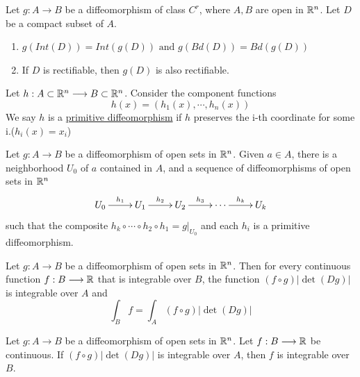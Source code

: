 \begin{theorem}
    Let $g:A\longrightarrow B$ be a diffeomorphism of class $C^r$, where $A,B$ are open in $\mathbb{R}^n$. Let $D$ be a compact subset of $A$.
    \begin{enumerate}
        \item $g(Int(D))=Int(g(D))\text{ and }g(Bd(D))=Bd(g(D))$
        \item If $D$ is rectifiable, then $g(D)$ is also rectifiable.
    \end{enumerate}
\end{theorem}

\begin{definition}
    Let $h:A\subset \mathbb{R}^n\longrightarrow B\subset \mathbb{R}^n$. Consider the component functions $$h(x)=(h_1(x),\cdots,h_n(x))$$
    We say $h$ is a \underline{primitive diffeomorphism} if $h$ preserves the i-th coordinate for some i.($h_i(x)=x_i$)
\end{definition}

\begin{theorem}
    Let $g:A\longrightarrow B$ be a diffeomorphism of open sets in $\mathbb{R}^n$. Given $a\in A$, there is a neighborhood $U_0$ of $a$ contained in $A$, and a sequence of diffeomorphisms of open sets in $\mathbb{R}^n$
    \begin{equation*}
        \xymatrix{U_0 \ar[r]^{h_1} &U_1 \ar[r]^{h_2} &U_2 \ar[r]^{h_3} & \cdots \ar[r]^{h_k}&U_k} 
    \end{equation*}
    such that the composite $h_k\circ\cdots\circ h_2\circ h_1=g|_{U_0}$ and each $h_i$ is a primitive diffeomorphism.
\end{theorem}

\begin{lemma}
    Let $g:A\longrightarrow B$ be a diffeomorphism of open sets in $\mathbb{R}^n$. Then for every continuous function $f:B\longrightarrow \mathbb{R}$ that is integrable over $B$,
    the function $(f\circ g)|\det(Dg)|$ is integrable over $A$ and
    \begin{equation*}
        \int_Bf=\int_A(f\circ g)|\det(Dg)|
    \end{equation*}
\end{lemma}

\begin{lemma}
    Let $g:A\longrightarrow B$ be a diffeomorphism of open sets in $\mathbb{R}^n$. Let $f:B\longrightarrow \mathbb{R}$ be continuous. 
    If $(f \circ g)|\det(Dg)|$ is integrable over $A$, then $f$ is integrable over $B$.
\end{lemma}

